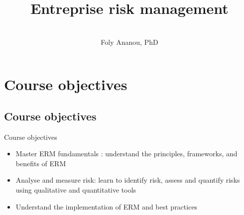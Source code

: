 \documentclass[aspectratio=169, 10pt]{beamer} %
\title{Entreprise risk management}
\author{ \\ 
Foly Ananou, PhD \\
    }
\date{}
\begin{document}
\begin{frame}[plain] %
  \centering
    \vspace{1cm}

  \maketitle
\end{frame}




\section{Course objectives}

\subsection{Course objectives}
\begin{frame}{Course objectives}
    \begin{itemize}
        \item[$\bullet$] Master ERM fundamentals : understand the principles, frameworks, 
        and benefits of ERM
\medskip

\item[$\bullet$] Analyse and measure risk: learn to identify risk, assess and quantify risks
 using qualitative and quantitative tools 
\medskip

        \item[$\bullet$] Understand the implementation of ERM and best practices
        \medskip


   \end{itemize}
\end{frame}
\end{document}
